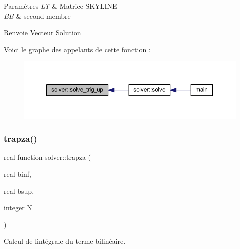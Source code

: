 \begin{DoxyParams}{Paramètres}
{\em LT} & Matrice S\+K\+Y\+L\+I\+NE \\
\hline
{\em BB} & second membre \\
\hline
\end{DoxyParams}
\begin{DoxyReturn}{Renvoie}
Vecteur Solution 
\end{DoxyReturn}
Voici le graphe des appelants de cette fonction \+:
\nopagebreak
\begin{figure}[H]
\begin{center}
\leavevmode
\includegraphics[width=350pt]{namespacesolver_a08b8f70c86d7bf39b32ce8fdcc872fd4_icgraph}
\end{center}
\end{figure}
\mbox{\label{namespacesolver_a5cdc774a6979796cb6b072b2fbb0e5af}} 
\subsubsection{\texorpdfstring{trapza()}{trapza()}}
{\footnotesize\ttfamily real function solver\+::trapza (\begin{DoxyParamCaption}\item[{real}]{binf,  }\item[{real}]{bsup,  }\item[{integer}]{N }\end{DoxyParamCaption})}



Calcul de l\textquotesingle{}intégrale du terme bilinéaire. 


